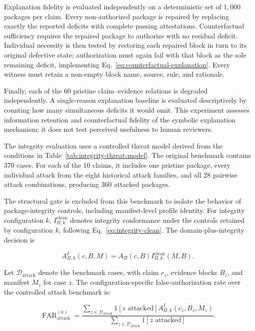 \documentclass[11pt,a4paper]{article}
\begin{document}
Explanation fidelity is evaluated independently on a deterministic set of $1,000$ packages per claim. Every non-authorized package is repaired by replacing exactly the reported deficits with complete passing attestations. Counterfactual sufficiency requires the repaired package to authorize with no residual deficit. Individual necessity is then tested by restoring each repaired block in turn to its original defective state; authorization must again fail with that block as the sole remaining deficit, implementing Eq.~\ref{eq:counterfactual-explanation}. Every witness must retain a non-empty block name, source, rule, and rationale.

Finally, each of the 60 pristine claim--evidence relations is degraded independently. A single-reason explanation baseline is evaluated descriptively by counting how many simultaneous deficits it would omit. This experiment assesses information retention and counterfactual fidelity of the symbolic explanation mechanism; it does not test perceived usefulness to human reviewers.

The integrity evaluation uses a controlled threat model derived from the conditions in Table~\ref{tab:integrity-threat-model}. The original benchmark contains 370 cases. For each of the 10 claims, it includes one pristine package, every individual attack from the eight historical attack families, and all 28 pairwise attack combinations, producing 360 attacked packages.

The structural gate is excluded from this benchmark to isolate the behavior of package-integrity controls, including manifest-level profile identity. For integrity configuration $k$, $I^{\mathrm{clean}}_{\Pi,k}$ denotes integrity conformance under the controls retained by configuration $k$, following Eq.~\ref{eq:integrity-clean}. The domain-plus-integrity decision is

\begin{equation}
A^{I}_{\Pi,k}(c,B,M)=
A_{\Pi}(c,B)
I^{\mathrm{clean}}_{\Pi,k}(M,B).
\label{eq:integrity-ablation-decision}
\end{equation}

Let $\mathcal{D}_{\mathrm{attack}}$ denote the benchmark cases, with claim $c_z$, evidence blocks $B_z$, and manifest $M_z$ for case $z$. The configuration-specific false-authorization rate over the controlled attack benchmark is:

\begin{equation}
\operatorname{FAR}^{(k)}_{\mathrm{attack}}=
\frac{
\sum_{z\in\mathcal{D}_{\mathrm{attack}}}
\mathrm{1}[z\text{ attacked}]
A^{I}_{\Pi,k}(c_z,B_z,M_z)
}{
\sum_{z\in\mathcal{D}_{\mathrm{attack}}}
\mathrm{1}[z\text{ attacked}]
}.
\label{eq:attack-far}
\end{equation}
\end{document}
